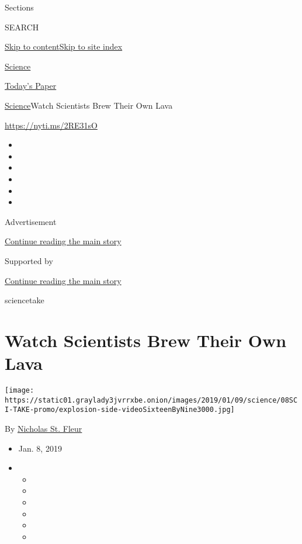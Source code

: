 Sections

SEARCH

\protect\hyperlink{site-content}{Skip to
content}\protect\hyperlink{site-index}{Skip to site index}

\href{https://www.nytimes3xbfgragh.onion/section/science}{Science}

\href{https://myaccount.nytimes3xbfgragh.onion/auth/login?response_type=cookie\&client_id=vi}{}

\href{https://www.nytimes3xbfgragh.onion/section/todayspaper}{Today's
Paper}

\href{/section/science}{Science}\textbar{}Watch Scientists Brew Their
Own Lava

\url{https://nyti.ms/2RE31sO}

\begin{itemize}
\item
\item
\item
\item
\item
\item
\end{itemize}

Advertisement

\protect\hyperlink{after-top}{Continue reading the main story}

Supported by

\protect\hyperlink{after-sponsor}{Continue reading the main story}

sciencetake

\hypertarget{watch-scientists-brew-their-own-lava}{%
\section{Watch Scientists Brew Their Own
Lava}\label{watch-scientists-brew-their-own-lava}}

\texttt{[image: https://static01.graylady3jvrrxbe.onion/images/2019/01/09/science/08SCI-TAKE-promo/explosion-side-videoSixteenByNine3000.jpg]}

By
\href{https://www.nytimes3xbfgragh.onion/by/nicholas-st-fleur}{Nicholas
St. Fleur}

\begin{itemize}
\item
  Jan. 8, 2019
\item
  \begin{itemize}
  \item
  \item
  \item
  \item
  \item
  \item
  \end{itemize}
\end{itemize}

